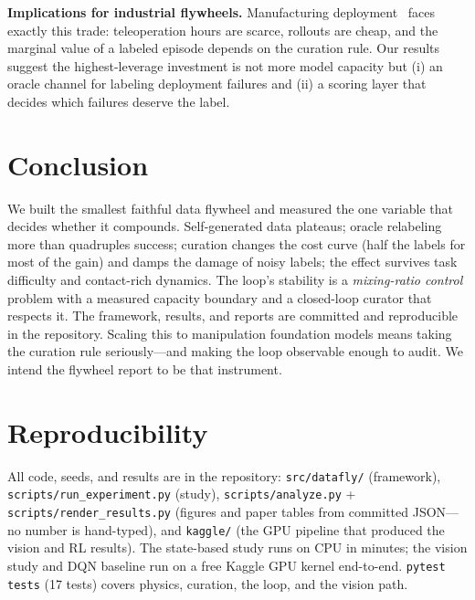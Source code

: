 \documentclass[conference]{IEEEtran}
\begin{document}
\textbf{Implications for industrial flywheels.} Manufacturing
deployment~\cite{mind2026} faces exactly this trade: teleoperation hours
are scarce, rollouts are cheap, and the marginal value of a labeled episode
depends on the curation rule. Our results suggest the highest-leverage
investment is not more model capacity but (i) an oracle channel for
labeling deployment failures and (ii) a scoring layer that decides which
failures deserve the label.

\section{Conclusion}
We built the smallest faithful data flywheel and measured the one variable
that decides whether it compounds. Self-generated data plateaus; oracle
relabeling more than quadruples success; curation changes the cost curve
(half the labels for most of the gain) and damps the damage of noisy
labels; the effect survives task difficulty and contact-rich dynamics.
The loop's stability is a \emph{mixing-ratio control} problem with a
measured capacity boundary and a closed-loop curator that respects it. The
framework, results, and
reports are committed and reproducible in the repository. Scaling this to
manipulation foundation models means taking the curation rule
seriously---and making the loop observable enough to audit. We intend the
flywheel report to be that instrument.

\section*{Reproducibility}
All code, seeds, and results are in the repository: \texttt{src/datafly/}
(framework), \texttt{scripts/run\_experiment.py} (study),
\texttt{scripts/analyze.py} + \texttt{scripts/render\_results.py} (figures
and paper tables from committed JSON---no number is hand-typed), and
\texttt{kaggle/} (the GPU pipeline that produced the vision and RL
results). The state-based study runs on CPU in minutes; the vision study
and DQN baseline run on a free Kaggle GPU kernel end-to-end. \texttt{pytest
tests} (17 tests) covers physics, curation, the loop, and the vision path.



\end{document}
